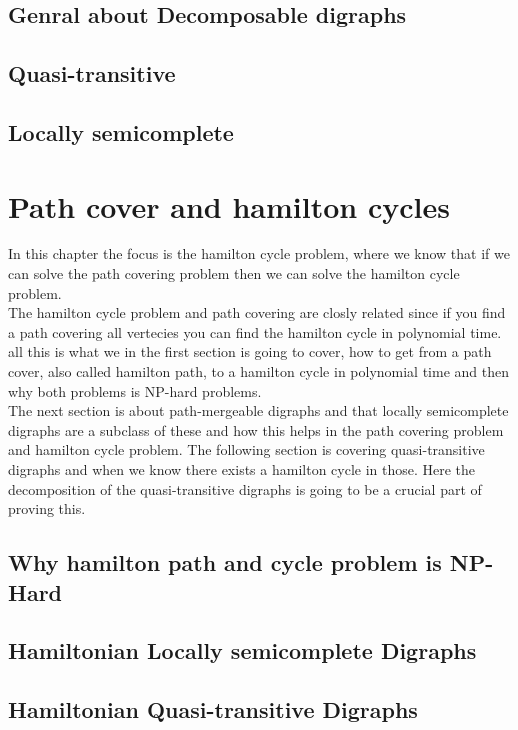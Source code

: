 \section{Genral about Decomposable digraphs}
\label{sec:gdecomposable}

\section{Quasi-transitive}
\label{sec:quasi}

\section{Locally semicomplete}
\label{sec:locally}


\chapter{Path cover and hamilton cycles}
\label{chap:hamilton}
In this chapter the focus is the hamilton cycle problem, where we know that if we can solve the path covering problem then we can solve the hamilton cycle problem.\\
The hamilton cycle problem and path covering are closly related since if you find a path covering all vertecies you can find the hamilton cycle in polynomial time. all this is what we in the first section is going to cover, how to get from a path cover, also called hamilton path, to a hamilton cycle in polynomial time and then why both problems is NP-hard problems.\\
The next section is about path-mergeable digraphs and that locally semicomplete digraphs are a subclass of these and how this helps in the path covering problem and hamilton cycle problem. 
The following section is covering quasi-transitive digraphs and when we know there exists a hamilton cycle in those. Here the decomposition of the quasi-transitive digraphs is going to be a crucial part of proving this. \\


\section{Why hamilton path and cycle problem is NP-Hard}
\label{sec:hNP}

\section{Hamiltonian Locally semicomplete Digraphs}
\label{sec:hlocally}

\section{Hamiltonian Quasi-transitive Digraphs}
\label{sec:hquasi}

